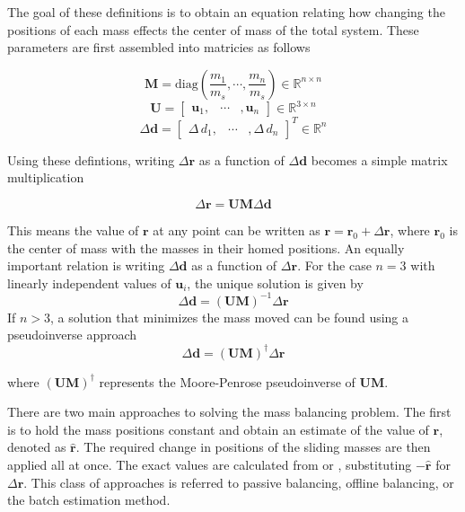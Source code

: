 The goal of these definitions is to obtain an equation relating how changing the positions of each mass effects the center of mass of the total system. These parameters are first assembled into matricies as follows

\begin{equation}
    \bm{M}=\mathrm{diag}(\frac{m_1}{m_s}, \cdots  ,\frac{m_n}{m_s}) \in \mathbb{R}^{n \times n}
\end{equation}
\begin{equation}
    \bm{U}=
    \begin{bmatrix}
        \bm{u}_1, & \cdots & ,\bm{u}_n
    \end{bmatrix}
    \in \mathbb{R}^{3 \times n}
\end{equation}
\begin{equation}
    \Delta\bm{d}=
    \begin{bmatrix}
        \Delta\,d_1, & \cdots & ,\Delta\,d_n 
    \end{bmatrix}^T
    \in \mathbb{R}^{n}
\end{equation}

Using these defintions, writing $\Delta\bm{r}$ as a function of $\Delta\bm{d}$ becomes a simple matrix multiplication

\begin{equation}
    \Delta\bm{r} = \bm{U}\bm{M}\Delta\bm{d}
\end{equation}
 
This means the value of $\bm{r}$ at any point can be written as $\bm{r}=\bm{r}_0+\Delta\bm{r}$, where $\bm{r}_0$ is the center of mass with the masses in their homed positions. An equally important relation is writing $\Delta\bm{d}$ as a function of $\Delta\bm{r}$. For the case $n = 3$ with linearly independent values of $\bm{u}_i$, the unique solution is given by
\begin{equation}\label{equation:delta_d_sol}
    \Delta\bm{d} = (\bm{U}\bm{M})^{-1}\Delta\bm{r}
\end{equation}
If $n>3$, a solution that minimizes the mass moved can be found using a pseudoinverse approach
\begin{equation}\label{equation:delta_d_pseudo_sol}
    \Delta\bm{d} = (\bm{U}\bm{M})^{\dagger }\Delta\bm{r}
\end{equation}

where $(\bm{U}\bm{M})^{\dagger}$ represents the Moore-Penrose pseudoinverse of $\bm{UM}$.

There are two main approaches to solving the mass balancing problem. The first is to hold the mass positions constant and obtain an estimate of the value of $\bm{r}$, denoted as $\hat{\bm{r}}$. The required change in positions of the sliding masses are then applied all at once. The exact values are calculated from  or , substituting $-\hat{\bm{r}}$ for $\Delta\bm{r}$. This class of approaches is referred to passive balancing, offline balancing, or the batch estimation method.

